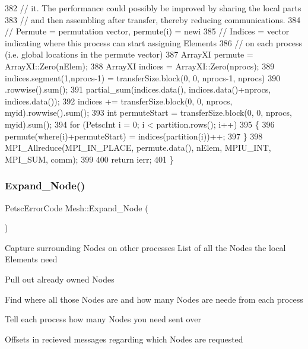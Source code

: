 \begin{DoxyCode}
382   \textcolor{comment}{// it.  The performance could possibly be improved by sharing the local parts}
383   \textcolor{comment}{// and then assembling after transfer, thereby reducing communications.}
384   \textcolor{comment}{// Permute = permutation vector, permute(i) = newi}
385   \textcolor{comment}{// Indices = vector indicating where this process can start assigning Elements}
386   \textcolor{comment}{//            on each process (i.e. global locations in the permute vector)}
387   ArrayXI permute = ArrayXI::Zero(nElem);
388   ArrayXI indices = ArrayXI::Zero(nprocs);
389   indices.segment(1,nprocs-1) = transferSize.block(0, 0, nprocs-1, nprocs)
390                                 .rowwise().sum();
391   partial\_sum(indices.data(), indices.data()+nprocs, indices.data());
392   indices += transferSize.block(0, 0, nprocs, myid).rowwise().sum();
393   \textcolor{keywordtype}{int} permuteStart = transferSize.block(0, 0, nprocs, myid).sum();
394   \textcolor{keywordflow}{for} (PetscInt i = 0; i < partition.rows(); i++)
395   \{
396     permute(where(i)+permuteStart) = indices(partition(i))++;
397   \}
398   MPI\_Allreduce(MPI\_IN\_PLACE, permute.data(), nElem, MPIU\_INT, MPI\_SUM, comm);
399 
400   \textcolor{keywordflow}{return} ierr;
401 \}
\end{DoxyCode}
\mbox{\label{class_mesh_a1930d80c707de6d202dac7cef0022257}} 
\subsubsection{\texorpdfstring{Expand\+\_\+\+Node()}{Expand\_Node()}}
{\footnotesize\ttfamily Petsc\+Error\+Code Mesh\+::\+Expand\+\_\+\+Node (\begin{DoxyParamCaption}{ }\end{DoxyParamCaption})\hspace{0.3cm}{\ttfamily [protected]}}

Capture surrounding Nodes on other processes List of all the Nodes the local Elements need

Pull out already owned Nodes

Find where all those Nodes are and how many Nodes are neede from each process

Tell each process how many Nodes you need sent over

Offsets in recieved messages regarding which Nodes are requested

